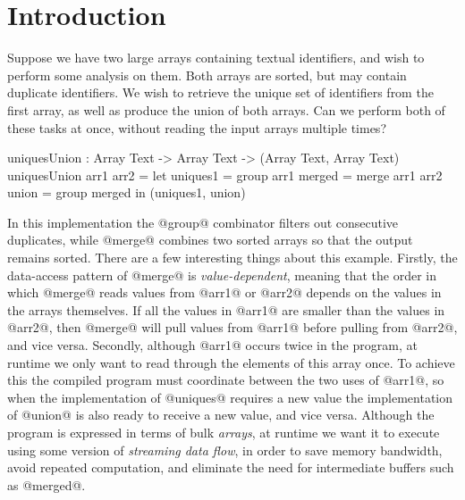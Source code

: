 \section{Introduction}
\label{s:Introduction}

Suppose we have two large arrays containing textual identifiers, and wish to perform some analysis on them. Both arrays are sorted, but may contain duplicate identifiers. 
We wish to retrieve the unique set of identifiers from the first array, as well as produce the union of both arrays. Can we perform both of these tasks at once, without reading the input arrays multiple times?
\begin{code}
  uniquesUnion : Array Text -> Array Text -> (Array Text, Array Text)
  uniquesUnion arr1 arr2
   = let  uniques1 = group arr1
          merged   = merge arr1 arr2
          union    = group merged
     in   (uniques1, union)
\end{code}



In this implementation the @group@ combinator filters out consecutive duplicates, while @merge@ combines two sorted arrays so that the output remains sorted. There are a few interesting things about this example. 
Firstly, the data-access pattern of @merge@ is \emph{value-dependent}, meaning that the order in which @merge@ reads values from @arr1@ or @arr2@ depends on the values in the arrays themselves. If all the values in @arr1@ are smaller than the values in @arr2@, then @merge@ will pull values from @arr1@ before pulling from @arr2@, and vice versa.
Secondly, although @arr1@ occurs twice in the program, at runtime we only want to read through the elements of this array once. To achieve this the compiled program must coordinate between the two uses of @arr1@, so when the implementation of @uniques@ requires a new value the implementation of @union@ is also ready to receive a new value, and vice versa.
Although the program is expressed in terms of bulk \emph{arrays}, at runtime we want it to execute using some version of \emph{streaming data flow}, in order to save memory bandwidth, avoid repeated computation, and eliminate the need for intermediate buffers such as @merged@.

